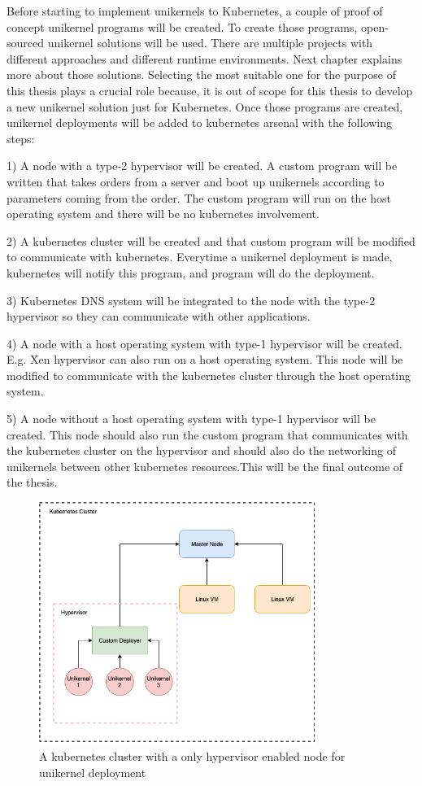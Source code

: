 Before starting to implement unikernels to Kubernetes, a couple of proof of concept unikernel programs will be created. To create those programs, open-sourced unikernel solutions will be used. There are multiple projects with different approaches and different runtime environments. Next chapter explains more about those solutions. Selecting the most suitable one for the purpose of this thesis plays a crucial role because, it is out of scope for this thesis to develop a new unikernel solution just for Kubernetes. Once those programs are created, unikernel deployments will be added to kubernetes arsenal with the following steps:

1) A node with a type-2 hypervisor will be created. A custom program will be written that takes orders from a server and boot up unikernels according to parameters coming from the order. The custom program will run on the host operating system and there will be no kubernetes involvement.

2) A kubernetes cluster will be created and that custom program will be modified to communicate with kubernetes. Everytime a unikernel deployment is made, kubernetes will notify this program, and program will do the deployment.

3) Kubernetes DNS system will be integrated to the node with the type-2 hypervisor so they can communicate with other applications.

4) A node with a host operating system with type-1 hypervisor will be created. E.g. Xen hypervisor can also run on a host operating system. This node will be modified to communicate with the kubernetes cluster through the host operating system. 

5) A node without a host operating system with type-1 hypervisor will be created. This node should also run the custom program that communicates with the kubernetes cluster on the hypervisor and should also do the networking of unikernels between other kubernetes resources.This will be the final outcome of the thesis.

\begin{figure}[htpb]
  \centering
  \includegraphics[width=0.8\textwidth]{figures/arch3.png}
  \caption{A kubernetes cluster with a only hypervisor enabled node for unikernel deployment} \label{fig:hypervisor}
\end{figure}


